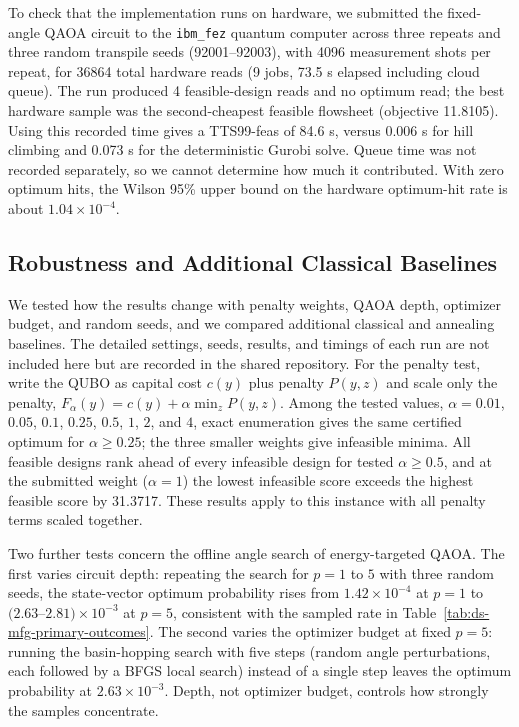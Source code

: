 \documentclass[10pt,letterpaper]{article}
\begin{document}
To check that the implementation runs on hardware, we submitted the fixed-angle QAOA circuit to the \texttt{ibm\_fez} quantum computer across three repeats and three random transpile seeds (92001--92003), with 4096 measurement shots per repeat, for 36864 total hardware reads (9 jobs, 73.5 s elapsed including cloud queue).
The run produced 4 feasible-design reads and no optimum read; the best hardware sample was the second-cheapest feasible flowsheet (objective 11.8105).
Using this recorded time gives a TTS99-feas of 84.6 s, versus 0.006 s for hill climbing and 0.073 s for the deterministic Gurobi solve.
Queue time was not recorded separately, so we cannot determine how much it contributed.
With zero optimum hits, the Wilson 95\% upper bound on the hardware optimum-hit rate is about $1.04\times 10^{-4}$.

\subsection{Robustness and Additional Classical Baselines}
\label{subsec:ds-mfg-robustness}

We tested how the results change with penalty weights, QAOA depth, optimizer budget, and random seeds, and we compared additional classical and annealing baselines.
The detailed settings, seeds, results, and timings of each run are not included here but are recorded in the shared repository.
For the penalty test, write the QUBO as capital cost $c(y)$ plus penalty $P(y,z)$ and scale only the penalty, $F_\alpha(y)=c(y)+\alpha\min_z P(y,z)$.
Among the tested values, $\alpha = 0.01$, $0.05$, $0.1$, $0.25$, $0.5$, $1$, $2$, and $4$, exact enumeration gives the same certified optimum for $\alpha\geq0.25$; the three smaller weights give infeasible minima.
All feasible designs rank ahead of every infeasible design for tested $\alpha\geq0.5$, and at the submitted weight ($\alpha=1$) the lowest infeasible score exceeds the highest feasible score by 31.3717.
These results apply to this instance with all penalty terms scaled together.

Two further tests concern the offline angle search of energy-targeted QAOA.
The first varies circuit depth: repeating the search for $p=1$ to $5$ with three random seeds, the state-vector optimum probability rises from $1.42\times10^{-4}$ at $p=1$ to $(2.63$--$2.81)\times10^{-3}$ at $p=5$, consistent with the sampled rate in Table~\ref{tab:ds-mfg-primary-outcomes}.
The second varies the optimizer budget at fixed $p=5$: running the basin-hopping search with five steps (random angle perturbations, each followed by a BFGS local search) instead of a single step leaves the optimum probability at $2.63\times10^{-3}$.
Depth, not optimizer budget, controls how strongly the samples concentrate.
\end{document}
